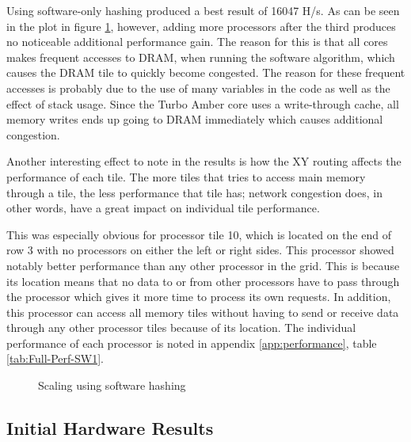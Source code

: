 Using software-only hashing produced a best result of 16047 H/s. As can be seen
in the plot in figure \ref{fig:sw-scaling1}, however, adding more processors after the third produces no
noticeable additional performance gain. The reason for this is that all cores makes frequent
accesses to DRAM, when running the software algorithm, which causes the DRAM tile to quickly
become congested. The reason for these frequent accesses is probably due to the use of
many variables in the code as well as the effect of stack usage. Since the Turbo Amber core
uses a write-through cache, all memory writes ends up going to DRAM immediately which causes
additional congestion.

Another interesting effect to note in the results is how the XY routing affects the performance
of each tile. The more tiles that tries to access main memory through a tile, the less
performance that tile has; network congestion does, in other words, have a great impact on individual
tile performance.

This was especially obvious for processor tile 10, which is located on the end of row 3 with no
processors on either the left or right sides. This processor showed notably better performance than
any other processor in the grid. This is because its location means that no data to or from other processors
have to pass through the processor which gives it more time to process its own requests. In addition,
this processor can access all memory tiles without having to send or receive data through any other
processor tiles because of its location. The individual performance of each processor is noted in
appendix \ref{app:performance}, table \ref{tab:Full-Perf-SW1}.

\begin{figure}
	\caption{Scaling using software hashing}
	\label{fig:sw-scaling1}
\end{figure}

\subsection{Initial Hardware Results}
\label{sec:init-hw-results}

